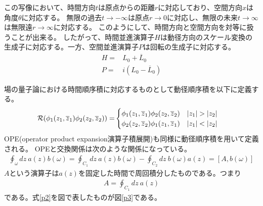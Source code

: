 \documentclass[11pt, dvipdfmx]{article}
\numberwithin{equation}{section}
\newcommand{\blankline}{\par\vspace{\baselineskip}} %
\begin{document}
この写像において、時間方向$t$は原点からの距離$r$に対応しており、空間方向$x$は角度$\theta$に対応する。
無限の過去$t\rightarrow -\infty$は原点$r\rightarrow 0$に対応し、無限の未来$t\rightarrow \infty$は無限遠$r\rightarrow \infty$に対応する。
このようにして、時間方向と空間方向を対等に扱うことが出来る。
したがって、時間並進演算子$H$は動径方向のスケール変換の生成子に対応する。一方、空間並進演算子$P$は回転の生成子に対応する。
\begin{align}
    H=&L_0 + \overline{L}_0\\
    P=&i(L_0 - \overline{L}_0
    )
\end{align}
\blankline
場の量子論における時間順序積に対応するものとして動径順序積を以下に定義する。
\begin{align}
    \mathcal{R}\qty(\phi_1(z_1,\overline{z}_1)\phi_2(z_2,\overline{z}_2))=&
    \begin{cases}
    \phi_1(z_1,\overline{z}_1)\phi_2(z_2,\overline{z}_2) & |z_1|>|z_2|\\
    \phi_2(z_2,\overline{z}_2)\phi_1(z_1,\overline{z}_1) & |z_1|<|z_2|
    \end{cases}
\end{align}
OPE(operator product expansion演算子積展開)も同様に動径順序積を用いて定義される。
OPEと交換関係は次のような関係になっている。
\begin{align}
    \oint_{\omega}dz \ a(z)b(\omega)=\oint_{C_1} dz \ a(z)b(\omega)-\oint_{C_2} dz \ b(\omega)a(z)=[A,b(\omega)]\label{p2}
\end{align}
$A$という演算子は$a(z)$を固定した時間で周回積分したものである。つまり
\begin{align}
    A=\oint_{C_1} dz \ a(z)
\end{align}
である。式\eqref{p2}を図で表したものが図\ref{p3}である。
\end{document}
